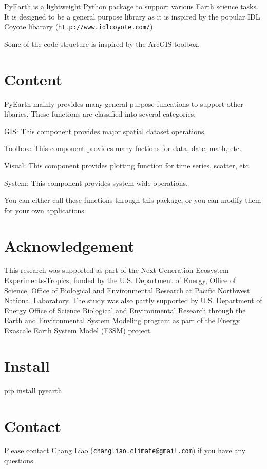 Py\-Earth is a lightweight Python package to support various Earth science tasks. It is designed to be a general purpose library as it is inspired by the popular I\-D\-L Coyote libarary (\href{http://www.idlcoyote.com/}{\tt http\-://www.\-idlcoyote.\-com/}).

Some of the code structure is inspired by the Arc\-G\-I\-S toolbox.

\section*{Content}

Py\-Earth mainly provides many general purpose funcations to support other libaries. These functions are classified into several categories\-:
\begin{DoxyEnumerate}
\item G\-I\-S\-: This component provides major spatial dataset operations.
\item Toolbox\-: This component provides many fuctions for data, date, math, etc.
\item Visual\-: This component provides plotting function for time series, scatter, etc.
\item System\-: This component provides system wide operations.
\end{DoxyEnumerate}

You can either call these functions through this package, or you can modify them for your own applications.

\section*{Acknowledgement}

This research was supported as part of the Next Generation Ecosystem Experiments-\/\-Tropics, funded by the U.\-S. Department of Energy, Office of Science, Office of Biological and Environmental Research at Pacific Northwest National Laboratory. The study was also partly supported by U.\-S. Department of Energy Office of Science Biological and Environmental Research through the Earth and Environmental System Modeling program as part of the Energy Exascale Earth System Model (E3\-S\-M) project.

\section*{Install}


\begin{DoxyEnumerate}
\item pip install pyearth
\end{DoxyEnumerate}

\section*{Contact}

Please contact Chang Liao (\href{mailto:changliao.climate@gmail.com}{\tt changliao.\-climate@gmail.\-com}) if you have any questions. 